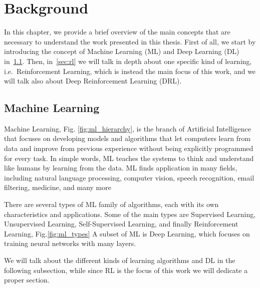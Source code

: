 
\chapter{Background}
\label{sec:background}
In this chapter, we provide a brief overview of the main concepts that are necessary to understand the work presented in this thesis.
First of all, we start by introducing the concept of Machine Learning (ML) and Deep Learning (DL) in~\ref{sec:machine_learning}.
Then, in~\ref{sec:rl} we will talk in depth about one specific kind of learning, i.e.\ Reinforcement Learning, which is instead the main focus of this work, and we will talk also about Deep Reinforcement Learning (DRL).

\section{Machine Learning}
\label{sec:machine_learning}

Machine Learning, Fig. \ref{fig:ml_hierarchy}, is the branch of Artificial Intelligence that focuses on developing models and algorithms that let computers learn from data and improve from previous experience without being explicitly programmed for every task.
In simple words, ML teaches the systems to think and understand like humans by learning from the data.
ML finds application in many fields, including natural language processing, computer vision, speech recognition, email filtering, medicine, and many more

There are several types of ML family of algorithms, each with its own characteristics and applications.
Some of the main types are Supervised Learning, Unsupervised Learning, Self-Supervised Learning, and finally Reinforcement Learning, Fig.\ref{fig:ml_types}
A subset of ML is Deep Learning, which focuses on training neural networks with many layers.

We will talk about the different kinds of learning algorithms and DL in the following subsection, while since RL is the focus of this work we will dedicate a proper section.





